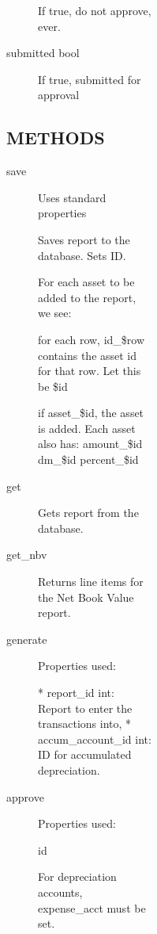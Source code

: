 \begin{description}
\begin{description}
\begin{description}
\begin{description}
\begin{description}
\begin{description}
\begin{description}
\begin{description}
\begin{description}
If true, do not approve, ever.


\item[{submitted bool}] \mbox{}

If true, submitted for approval

\end{description}
\subsection*{METHODS\label{LedgerSMB::DBObject::Asset_Report_METHODS}}
\begin{description}

\item[{save}] \mbox{}

Uses standard properties



Saves report to the database.  Sets ID.



For each asset to be added to the report, we see:



for each row, id\_\$row contains the asset id for that row.  Let this be \$id



if asset\_\$id, the asset is added.  Each asset also has:
amount\_\$id
dm\_\$id
percent\_\$id


\item[{get}] \mbox{}

Gets report from the database.


\item[{get\_nbv}] \mbox{}

Returns line items for the Net Book Value report.


\item[{generate}] \mbox{}

Properties used:



* report\_id int:  Report to enter the transactions into, 
* accum\_account\_id int:  ID for accumulated depreciation.


\item[{approve}] \mbox{}

Properties used:



id



For depreciation accounts, expense\_acct must be set.




\end{description}
\end{description}
\end{description}
\end{description}
\end{description}
\end{description}
\end{description}
\end{description}
\end{description}
